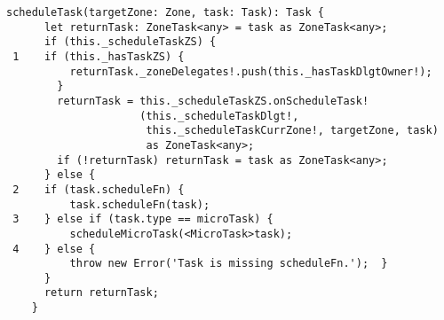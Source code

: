 \begin{verbatim}
scheduleTask(targetZone: Zone, task: Task): Task {
      let returnTask: ZoneTask<any> = task as ZoneTask<any>;
      if (this._scheduleTaskZS) {
 1    if (this._hasTaskZS) {
          returnTask._zoneDelegates!.push(this._hasTaskDlgtOwner!);
        }
        returnTask = this._scheduleTaskZS.onScheduleTask!
                     (this._scheduleTaskDlgt!,
                      this._scheduleTaskCurrZone!, targetZone, task)
                      as ZoneTask<any>;
        if (!returnTask) returnTask = task as ZoneTask<any>;
      } else {
 2    if (task.scheduleFn) {
          task.scheduleFn(task);
 3    } else if (task.type == microTask) {
          scheduleMicroTask(<MicroTask>task);
 4    } else {
          throw new Error('Task is missing scheduleFn.');  }
      }
      return returnTask;
    }
\end{verbatim}
